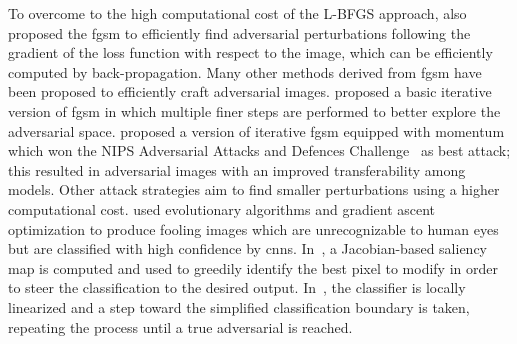 To overcome to the high computational cost of the L-BFGS approach, \citet{goodfellow2014explaining} also proposed the \gls{fgsm} to efficiently find adversarial perturbations following the gradient of the loss function with respect to the image, which can be efficiently computed by back-propagation.
Many other methods derived from \gls{fgsm} have been proposed to efficiently craft adversarial images.
\citet{kurakin2016adversarial} proposed a basic iterative version of \gls{fgsm} in which multiple finer steps are performed to better explore the adversarial space.
\citet{dong2018boosting} proposed a version of iterative \gls{fgsm} equipped with momentum which won the NIPS Adversarial Attacks and Defences Challenge~\cite{kurakin2018adversarial} as best attack;
this resulted in adversarial images with an improved transferability among models.
Other attack strategies aim to find smaller perturbations using a higher computational cost.
\citet{nguyen2015deep} used evolutionary algorithms and gradient ascent optimization to produce fooling images which are unrecognizable to human eyes but are classified with high confidence by \glspl{cnn}.
In~\cite{papernot2016limitations}, a Jacobian-based saliency map is computed and used to greedily identify the best pixel to modify in order to steer the classification to the desired output.
In~\cite{moosavi2016deepfool}, the classifier is locally linearized and a step toward the simplified classification boundary is taken, repeating the process until a true adversarial is reached.
